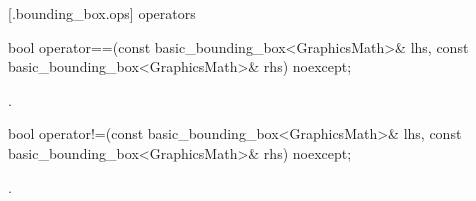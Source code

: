  [\iotwod.bounding_box.ops] { operators}

%
\begin{itemdecl}
bool operator==(const basic_bounding_box<GraphicsMath>& lhs,
  const basic_bounding_box<GraphicsMath>& rhs) noexcept;
\end{itemdecl}
\begin{itemdescr}
\pnum
\returns
{}.
\end{itemdescr}

%
\begin{itemdecl}
bool operator!=(const basic_bounding_box<GraphicsMath>& lhs,
  const basic_bounding_box<GraphicsMath>& rhs) noexcept;
\end{itemdecl}
\begin{itemdescr}
\pnum
\returns
{}.
\end{itemdescr}

